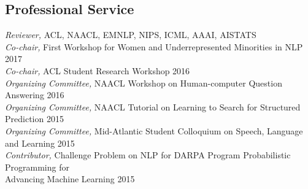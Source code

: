 \documentclass[margin,line]{resume}
\begin{document}
\begin{resume}
\section{\sc Professional Service}
\emph{Reviewer,} ACL, NAACL, EMNLP, NIPS, ICML, AAAI, AISTATS\\
\emph{Co-chair,} First Workshop for Women and Underrepresented Minorities in NLP \hfill 2017\\
\emph{Co-chair,} ACL Student Research Workshop \hfill 2016\\
\emph{Organizing Committee,} NAACL Workshop on Human-computer Question Answering \hfill 2016\\
\emph{Organizing Committee,} NAACL Tutorial on Learning to Search for Structured Prediction \hfill 2015\\
\emph{Organizing Committee,} Mid-Atlantic Student Colloquium on Speech, Language and Learning \hfill 2015\\
\emph{Contributor,} Challenge Problem on NLP for DARPA Program Probabilistic Programming for\\
Advancing Machine Learning \hfill 2015\\

\end{resume}
\end{document}
